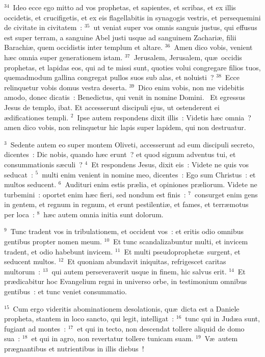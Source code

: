 ${}^{34}$~Ideo ecce ego mitto ad vos prophetas, et sapientes, et scribas, et ex illis occidetis, et crucifigetis, et ex eis flagellabitis in synagogis vestris, et persequemini de civitate in civitatem~:
${}^{35}$~ut veniat super vos omnis sanguis justus, qui effusus est super terram, a sanguine Abel justi usque ad sanguinem Zachari\ae , filii Barachi\ae , quem occidistis inter templum et altare.
${}^{36}$~Amen dico vobis, venient h\ae c omnia super generationem istam.
${}^{37}$~Jerusalem, Jerusalem, qu\ae\ occidis prophetas, et lapidas eos, qui ad te missi sunt, quoties volui congregare filios tuos, quemadmodum gallina congregat pullos suos sub alas, et noluisti~?
${}^{38}$~Ecce relinquetur vobis domus vestra deserta.
${}^{39}$~Dico enim vobis, non me videbitis amodo, donec dicatis~: Benedictus, qui venit in nomine Domini.
~Et egressus Jesus de templo, ibat. Et accesserunt discipuli ejus, ut ostenderent ei \ae dificationes templi.
${}^{2}$~Ipse autem respondens dixit illis~: Videtis h\ae c omnia~? amen dico vobis, non relinquetur hic lapis super lapidem, qui non destruatur.


${}^{3}$~Sedente autem eo super montem Oliveti, accesserunt ad eum discipuli secreto, dicentes~: Dic nobis, quando h\ae c erunt~? et quod signum adventus tui, et consummationis s\ae culi~?
${}^{4}$~Et respondens Jesus, dixit eis~: Videte ne quis vos seducat~:
${}^{5}$~multi enim venient in nomine meo, dicentes~: Ego sum Christus~: et multos seducent.
${}^{6}$~Audituri enim estis pr\ae lia, et opiniones pr\ae liorum. Videte ne turbemini~: oportet enim h\ae c fieri, sed nondum est finis~:
${}^{7}$~consurget enim gens in gentem, et regnum in regnum, et erunt pestilenti\ae , et fames, et terr\ae motus per loca~:
${}^{8}$~h\ae c autem omnia initia sunt dolorum.


${}^{9}$~Tunc tradent vos in tribulationem, et occident vos~: et eritis odio omnibus gentibus propter nomen meum.
${}^{10}$~Et tunc scandalizabuntur multi, et invicem tradent, et odio habebunt invicem.
${}^{11}$~Et multi pseudoprophet\ae\ surgent, et seducent multos.
${}^{12}$~Et quoniam abundavit iniquitas, refrigescet caritas multorum~:
${}^{13}$~qui autem perseveraverit usque in finem, hic salvus erit.
${}^{14}$~Et pr\ae dicabitur hoc Evangelium regni in universo orbe, in testimonium omnibus gentibus~: et tunc veniet consummatio.


${}^{15}$~Cum ergo videritis abominationem desolationis, qu\ae\ dicta est a Daniele propheta, stantem in loco sancto, qui legit, intelligat~:
${}^{16}$~tunc qui in Jud\ae a sunt, fugiant ad montes~:
${}^{17}$~et qui in tecto, non descendat tollere aliquid de domo sua~:
${}^{18}$~et qui in agro, non revertatur tollere tunicam suam.
${}^{19}$~V\ae\ autem pr\ae gnantibus et nutrientibus in illis diebus~!


